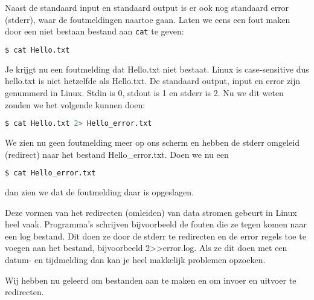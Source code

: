 Naast de standaard input en standaard output is er ook nog standaard error (stderr), waar de foutmeldingen naartoe gaan.
Laten we eens een fout maken door een niet bestaan bestand aan \texttt{cat} te geven:

\begin{lstlisting}[language=bash]
$ cat Hello.txt
\end{lstlisting}

Je krijgt nu een foutmelding dat Hello.txt niet bestaat. Linux is case-sensitive dus hello.txt is niet hetzelfde als Hello.txt. De standaard output, input en error zijn genummerd in Linux. Stdin is 0, stdout is 1 en stderr is 2. Nu we dit weten zouden we het volgende kunnen doen:

\begin{lstlisting}[language=bash]
$ cat Hello.txt 2> Hello_error.txt
\end{lstlisting}

We zien nu geen foutmelding meer op ons scherm en hebben de stderr omgeleid (redirect) naar het bestand Hello\_error.txt. Doen we nu een
\begin{lstlisting}[language=bash]
$ cat Hello_error.txt
\end{lstlisting}
dan zien we dat de foutmelding daar is opgeslagen.

Deze vormen van het redirecten (omleiden) van data stromen gebeurt in Linux heel vaak. Programma's schrijven bijvoorbeeld de fouten die ze tegen komen naar een log bestand. Dit doen ze door de stderr te redirecten en de error regels toe te voegen aan het bestand, bijvoorbeeld 2>>error.log. Als ze dit doen met een datum- en tijdmelding dan kan je heel makkelijk problemen opzoeken.

Wij hebben nu geleerd om bestanden aan te maken en om invoer en uitvoer te redirecten.

